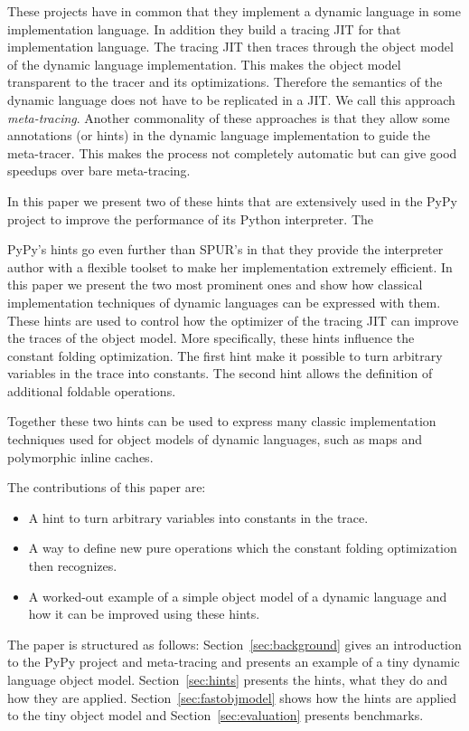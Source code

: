 \documentclass{sig-alternate}
\begin{document}
These projects have in common that they implement a dynamic language in some
implementation language. In addition they build a tracing JIT for that implementation
language. The tracing JIT then traces through the object model of the dynamic
language implementation. This makes the object model transparent to the tracer
and its optimizations. Therefore the semantics of the dynamic language does not
have to be replicated in a JIT. We call this approach \emph{meta-tracing}.
Another commonality of these approaches is that they allow some annotations (or
hints) in the dynamic language implementation to guide the meta-tracer. This
makes the process not completely automatic but can give good speedups over
bare meta-tracing.

In this paper we present two of these hints that are extensively used in the
PyPy project to improve the performance of its Python interpreter.
 The 

PyPy's hints go even further than SPUR's in that they provide the interpreter
author with a flexible toolset to make her implementation extremely efficient.
In this paper we present the two most prominent ones and show how classical
implementation techniques of dynamic languages can be expressed with them. These
hints are used to control how the optimizer of the tracing JIT can improve the
traces of the object model. More specifically, these hints influence the
constant folding optimization. The first hint make it possible to turn arbitrary
variables in the trace into constants. The second hint allows the definition of
additional foldable operations.

Together these two hints can be used to express many classic implementation
techniques used for object models of dynamic languages, such as maps and
polymorphic inline caches.

The contributions of this paper are:
\begin{itemize}
 \item A hint to turn arbitrary variables into constants in the trace.
 \item A way to define new pure operations which the constant folding
 optimization then recognizes.
 \item A worked-out example of a simple object model of a dynamic language and
 how it can be improved using these hints.
\end{itemize}

The paper is structured as follows: Section~\ref{sec:background} gives an
introduction to the PyPy project and meta-tracing and presents an example of a
tiny dynamic language object model. Section~\ref{sec:hints} presents the hints,
what they do and how they are applied. Section~\ref{sec:fastobjmodel} shows how
the hints are applied to the tiny object model and Section~\ref{sec:evaluation}
presents benchmarks.
\end{document}
